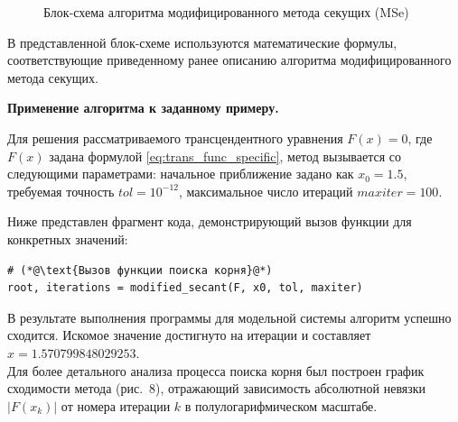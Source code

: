 \documentclass[12pt,a4paper]{article}
\theoremstyle{bigplain}
\theoremstyle{plain}
\begin{document}
\begin{figure}[h!]
\caption{Блок-схема алгоритма модифицированного метода секущих (MSe)}
\label{fig:mse_flowchart}
\end{figure}

В представленной блок-схеме используются математические формулы, соответствующие приведенному ранее описанию алгоритма модифицированного метода секущих.




\newpage



\noindent\textbf{Применение алгоритма к заданному примеру.}

Для решения рассматриваемого трансцендентного уравнения $F(x) = 0$, 
где $F(x)$ задана формулой \eqref{eq:trans_func_specific},
метод вызывается со следующими параметрами:
начальное приближение задано как $x_0 = 1.5$, 
требуемая точность $tol = 10^{-12}$,
максимальное число итераций $maxiter = 100$. 

Ниже представлен фрагмент кода, демонстрирующий вызов функции
для конкретных значений:

\begin{lstlisting}[basicstyle=\ttfamily\bfseries\small]
# (*@\text{Вызов функции поиска корня}@*)
root, iterations = modified_secant(F, x0, tol, maxiter)
\end{lstlisting}

В результате выполнения программы для модельной системы алгоритм
успешно сходится. Искомое значение достигнуто на 
итерации и составляет \textbf{$x = 1.570799848029253$}. \\

Для более детального анализа процесса поиска корня был построен график 
сходимости метода (рис.~8), отражающий 
зависимость абсолютной невязки $|F(x_k)|$ от номера итерации $k$ 
в полулогарифмическом масштабе.
\end{document}
